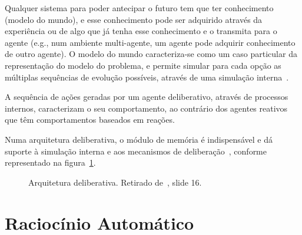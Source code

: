 Qualquer sistema para poder antecipar o futuro tem que ter conhecimento (modelo do mundo), e esse conhecimento pode ser adquirido através da experiência ou de algo que já tenha esse conhecimento e o transmita para o agente (e.g., num ambiente multi-agente, um agente pode adquirir conhecimento de outro agente).
O modelo do mundo caracteriza-se como um caso particular da representação do modelo do problema, e permite simular para cada opção as múltiplas sequências de evolução possíveis, através de uma simulação interna~\cite{isel:iasa:slides:arq-agentes-deliberativos}.

A sequência de ações geradas por um agente deliberativo, através de processos internos, caracterizam o seu comportamento, ao contrário dos agentes reativos que têm comportamentos baseados em reações.

Numa arquitetura deliberativa, o módulo de memória é indispensável e dá suporte à simulação interna e aos mecanismos de deliberação~\cite{isel:iasa:slides:arq-agentes-deliberativos}, conforme representado na figura~\ref{fig:arquitetura-deliberativa}.

\begin{figure}[H]
    \begin{center}
    \end{center}
    \caption{Arquitetura deliberativa.
    Retirado de~\cite{isel:iasa:slides:arq-agentes-deliberativos}, slide 16.}
    \label{fig:arquitetura-deliberativa}
\end{figure}


\section{Raciocínio Automático}\label{sec:raciocinio-automatico-1}

